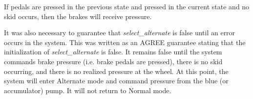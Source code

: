\begin{tt}
If pedals are pressed in the previous state and pressed in the current state and no skid occurs, then the brakes will receive pressure. 
\end{tt}

It was also necessary to guarantee that \textit{select\_alternate} is false until an error occurs in the system. This was written as an AGREE guarantee stating that the initialization of \textit{select\_alternate} is false. It remains false until the system commands brake pressure (i.e. brake pedals are pressed), there is no skid occurring, and there is no realized pressure at the wheel. At this point, the system will enter Alternate mode and command pressure from the blue (or accumulator) pump. It will not return to Normal mode. 


















